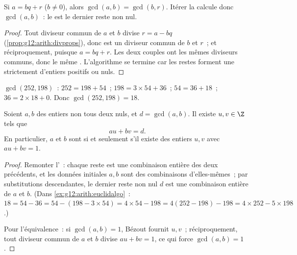 \begin{proposition}\label{prop:g12:arith:euclidalgo}
Si $a = bq + r$ ($b \neq 0$), alors $\gcd(a, b) = \gcd(b, r)$. Itérer la
 calcule donc $\gcd(a,b)$~: le  est le dernier reste
non nul.
\end{proposition}

\begin{proof}
Tout diviseur commun de $a$ et $b$ divise $r = a - bq$
(\cref{prop:g12:arith:divprops}), donc est un diviseur commun de $b$ et $r$~;
et réciproquement, puisque $a = bq + r$. Les deux couples ont les mêmes
diviseurs communs, donc le même . L'algorithme se termine car les restes
forment une  strictement  d'entiers positifs ou nuls.
\end{proof}

\begin{example}\label{ex:g12:arith:euclidalgo}
$\gcd(252, 198)$~: $252 = 198 + 54$~; $198 = 3\times54 + 36$~;
$54 = 36 + 18$~; $36 = 2 \times 18 + 0$. Donc $\gcd(252,198) = 18$.
\end{example}

\begin{theorem}\label{thm:g12:arith:bezout}
Soient $a, b$ des entiers non tous deux nuls, et $d = \gcd(a,b)$. Il existe
$u, v \in \Z$ tels que
\[
au + bv = d .
\]
En particulier, $a$ et $b$ sont  si et seulement s'il
existe des entiers $u, v$ avec $au + bv = 1$.
\end{theorem}

\begin{proof}
Remonter l'~: chaque reste est une combinaison entière
des deux précédents, et les données initiales $a, b$ sont des combinaisons
d'elles-mêmes~; par substitutions descendantes, le dernier reste non nul $d$
est une combinaison entière de $a$ et $b$. (Dans
\cref{ex:g12:arith:euclidalgo}~:
$18 = 54 - 36 = 54 - (198 - 3\times54) = 4\times54 - 198 =
4(252 - 198) - 198 = 4\times252 - 5\times198$.)

Pour l'équivalence~: si $\gcd(a,b) = 1$, Bézout fournit $u, v$~;
réciproquement, tout diviseur commun de $a$ et $b$ divise $au + bv = 1$,
ce qui force $\gcd(a,b) = 1$.
\end{proof}

